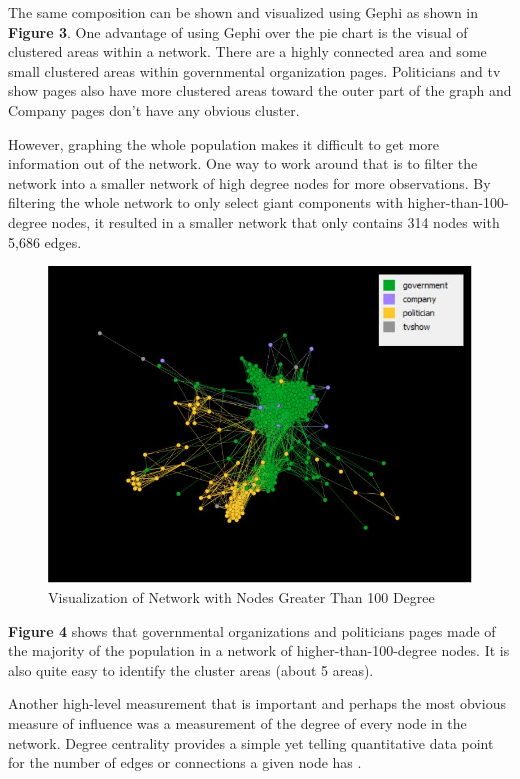 \documentclass[11pt,twocolumn]{article}
\begin{document}
The same composition can be shown and visualized using Gephi as shown in \textbf{Figure 3}. One advantage of using Gephi over the pie chart is the visual of clustered areas within a network. There are a highly connected area and some small clustered areas within governmental organization pages. Politicians and tv show pages also have more clustered areas toward the outer part of the graph and Company pages don't have any obvious cluster. 

However, graphing the whole population makes it difficult to get more information out of the network. One way to work around that is to filter the network into a smaller network of high degree nodes for more observations. By filtering the whole network to only select giant components with higher-than-100-degree nodes, it resulted in a smaller network that only contains 314 nodes with 5,686 edges.


\begin{figure}[hbt!]
\includegraphics[scale=0.4]{gephi_filtered_100_degree.JPG} 
\caption{Visualization of Network with Nodes Greater Than 100 Degree}
\end{figure}

\textbf{Figure 4} shows that governmental organizations and politicians pages made of the majority of the population in a network of higher-than-100-degree nodes. It is also quite easy to identify the cluster areas (about 5 areas).

Another high-level measurement that is important and perhaps the most obvious measure of influence was a measurement of the degree of every node in the network. Degree centrality provides a simple yet telling quantitative data point for the number of edges or connections a given node has \cite{newman2008mathematics}.
\end{document}
